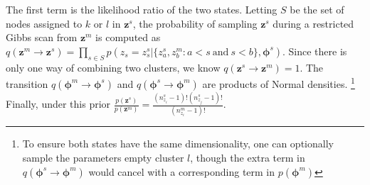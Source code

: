 \documentclass{article}
\begin{document}
The first term is the likelihood ratio of the two states.  Letting $S$ be the set of nodes assigned to $k$ or $l$ in $\mathbf{z}^{s}$, the probability of sampling $\mathbf{z}^{s}$ during a restricted Gibbs scan from  $\mathbf{z}^{m}$ is computed as $q( \mathbf{z}^{m} \rightarrow \mathbf{z}^{s}) = \prod_{s \in S} p(z_{s}=z_s^{s} |\{ z_a^{s},z_{b}^{m}: a  < s \ \mbox{and} \ s < b\}, \boldsymbol{\phi}^{s})$.  Since there is only one way of combining two clusters, we know $q(\mathbf{z}^{s} \rightarrow \mathbf{z}^{m})=1$.   The transition $q(\boldsymbol{\phi}^{m} \rightarrow \boldsymbol{\phi}^{s})$ and 
$q(\boldsymbol{\phi}^{s} \rightarrow
\boldsymbol{\phi}^{m})$ are products of Normal densities. \footnote{To ensure both states have the same dimensionality, one can optionally sample the parameters empty cluster $l$, though the extra term  in $q(\boldsymbol{\phi}^{s} \rightarrow \boldsymbol{\phi}^{m})$ would cancel with a corresponding term in $p(\boldsymbol{\phi}^{m})$}  Finally, under this prior $ \frac{p(\mathbf{z}^{s})}{p(\mathbf{z}^{m})} = \frac{(n_{z_i}^{s} - 1)!(n_{z_j}^{s} - 1)!}{(n_{z_i}^{m}-1)!}$.   



\end{document}
